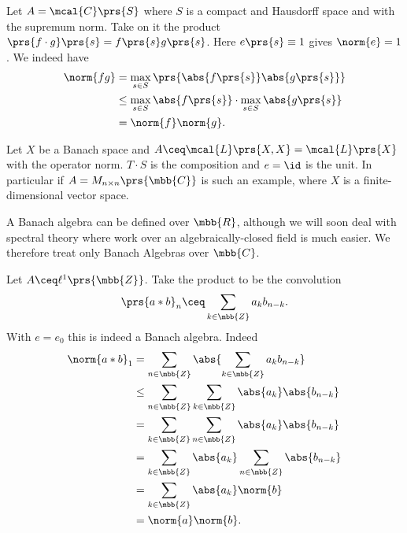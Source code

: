 \documentclass[10pt, twoside]{book}
\begin{document}
\begin{example}
Let $A = \mcal{C}\prs{S}$ where $S$ is a compact and Hausdorff space and with the supremum norm.
Take on it the product $\prs{f \cdot g}\prs{s} = f\prs{s} g\prs{s}$. Here $e \prs{s} \equiv 1$ gives $\norm{e} = 1$.
We indeed have
\begin{align*}
\norm{fg} &= \max_{s \in S} \prs{\abs{f\prs{s}} \abs{g\prs{s}}}
\\&\leq \max_{s \in S} \abs{f\prs{s}} \cdot \max_{s \in S} \abs{g\prs{s}}
\\&= \norm{f}\norm{g} \text{.}
\end{align*}
\end{example}

\begin{example}
Let $X$ be a Banach space and $A \ceq \mcal{L}\prs{X,X} = \mcal{L}\prs{X}$ with the operator norm. $T \cdot S$ is the composition and $e = \id$ is the unit.
In particular if $A = M_{n \times n}\prs{\mbb{C}}$ is such an example, where $X$ is a finite-dimensional vector space.
\end{example}

\begin{remark}
A Banach algebra can be defined over $\mbb{R}$, although we will soon deal with spectral theory where work over an algebraically-closed field is much easier. We therefore treat only Banach Algebras over $\mbb{C}$.
\end{remark}

\begin{example}
Let $A \ceq \ell^1 \prs{\mbb{Z}}$. Take the product to be the convolution
\[\prs{a * b}_n \ceq \sum_{k \in \mbb{Z}} a_k b_{n-k} \text{.}\]
With $e = e_0$ this is indeed a Banach algebra.
Indeed
\begin{align*}
\norm{a * b}_1 &= \sum_{n \in \mbb{Z}} \abs{\sum_{k \in \mbb{Z}} a_k b_{n-k}}
\\&\leq
\sum_{n \in \mbb{Z}} \sum_{k \in \mbb{Z}} \abs{a_k} \abs{b_{n-k}}
\\&= \sum_{k \in \mbb{Z}} \sum_{n \in \mbb{Z}} \abs{a_k} \abs{b_{n-k}}
\\&= \sum_{k \in \mbb{Z}} \abs{a_k} \sum_{n \in \mbb{Z}} \abs{b_{n-k}}
\\&=
\sum_{k \in \mbb{Z}} \abs{a_k} \norm{b}
\\&= \norm{a} \norm{b} \text{.}
\end{align*}
\end{example}
\end{document}
